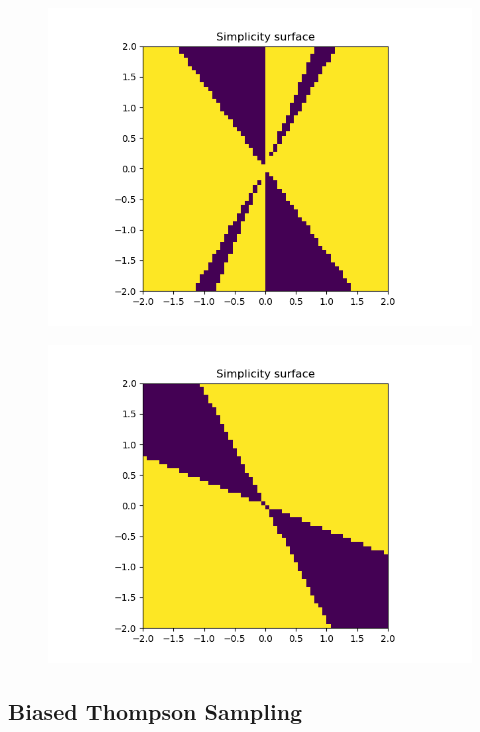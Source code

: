 \begin{figure}[h!]
\centering
\includegraphics[width=1\textwidth,height=0.5\textheight]{../../pictures/figures/complexity_surface_nd-4d-S-0.png}
\caption{}
\end{figure}

\begin{figure}[h!]
\centering
\includegraphics[width=1\textwidth,height=0.5\textheight]{../../pictures/figures/complexity_surface_nd-4d-S-2.png}
\caption{}
\end{figure}


\subsection{Biased Thompson Sampling} \label{thompson-sampling}

